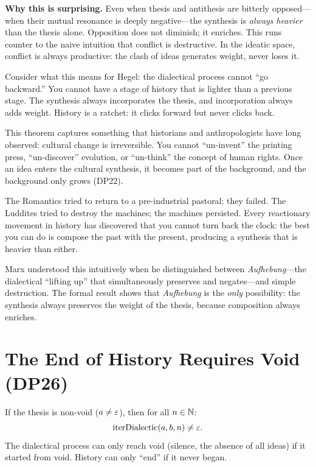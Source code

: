 \begin{surprisebox}
\noindent\textbf{Why this is surprising.}
Even when thesis and antithesis are bitterly opposed---when their mutual
resonance is deeply negative---the synthesis is \emph{always heavier}
than the thesis alone.  Opposition does not diminish; it enriches.
This runs counter to the naive intuition that conflict is destructive.
In the ideatic space, conflict is always productive: the clash of
ideas generates weight, never loses it.

Consider what this means for Hegel: the dialectical process cannot
``go backward.''  You cannot have a stage of history that is lighter
than a previous stage.  The synthesis always incorporates the thesis,
and incorporation always adds weight.  History is a ratchet: it clicks
forward but never clicks back.
\end{surprisebox}

\begin{interpretation}
\label{interp:cultural-irreversibility}
This theorem captures something that historians and anthropologists
have long observed: cultural change is irreversible.  You cannot
``un-invent'' the printing press, ``un-discover'' evolution, or
``un-think'' the concept of human rights.  Once an idea enters the
cultural synthesis, it becomes part of the background, and the
background only grows (DP22).

The Romantics tried to return to a pre-industrial pastoral; they
failed.  The Luddites tried to destroy the machines; the machines
persisted.  Every reactionary movement in history has discovered
that you cannot turn back the clock: the best you can do is compose
the past with the present, producing a synthesis that is heavier
than either.

Marx understood this intuitively when he distinguished between
\textit{Aufhebung}---the dialectical ``lifting up'' that simultaneously
preserves and negates---and simple destruction.  The formal result
shows that \textit{Aufhebung} is the \emph{only} possibility: the
synthesis always preserves the weight of the thesis, because
composition always enriches.
\end{interpretation}

\section{The End of History Requires Void (DP26)}

\begin{theorem}
\label{thm:end-of-history}
If the thesis is non-void ($a \neq \varepsilon$), then for all $n \in \mathbb{N}$:
\[
\mathrm{iterDialectic}(a, b, n) \neq \varepsilon.
\]
The dialectical process can only reach void (silence, the absence of all
ideas) if it started from void.  History can only ``end'' if it never began.
\end{theorem}

